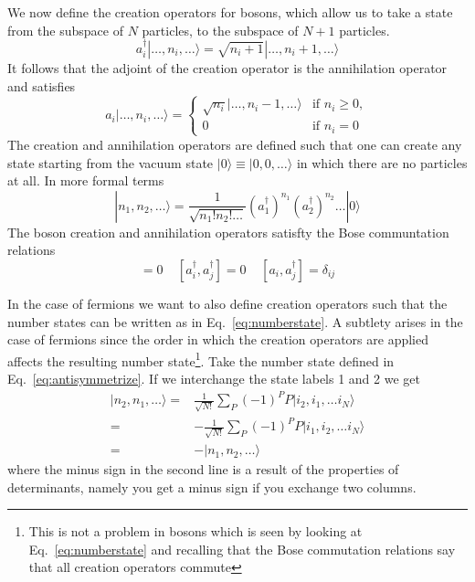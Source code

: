 \documentclass[11pt,letter]{article}
\begin{document}
We now define the creation  operators for bosons, which allow us to take a
state from the subspace of $N$ particles, to the subspace of $N+1$  particles.
\begin{equation}
 a_{i}^{\dagger} | \ldots, n_{i}, \ldots \rangle  = 
 \sqrt{n_{i}+1}|\ldots, n_{i}+1, \dots\rangle
\end{equation}
It follows that the adjoint of the creation operator is the annihilation
operator and satisfies 
\begin{equation}
a_{i} | \ldots, n_{i}, \ldots \rangle  
=\begin{cases}
\sqrt{n_{i}}|\ldots, n_{i}-1, \dots\rangle
& \text{if $n_{i}\geq 0$},\\
0 & \text{if $n_{i}=0$}
\end{cases}
\end{equation}
The creation and annihilation operators are defined such that one can create
any state starting from the vacuum state $|0\rangle \equiv |0,0,\ldots\rangle$
in which there are no particles at all.  In more formal terms 
\begin{equation}
  | n_{1}, n_{2}, \dots \rangle = \frac{1}{\sqrt{n_{1}!n_{2}!\ldots}} 
   ( a_{1}^{\dagger} ) ^{n_{1}}  
   ( a_{2}^{\dagger} ) ^{n_{2}}  \ldots | 0 \rangle
  \label{eq:numberstate}
\end{equation}
The boson creation and annihilation operators satisfty the Bose communtation
relations 
\begin{equation}
  [a_{i}, a_{j}] = 0 \ \ \ \ \  
  [a_{i}^{\dagger}, a_{j}^{\dagger}] = 0 \ \ \ \ \   
  [a_{i},a_{j}^{\dagger}]=\delta_{ij}
\end{equation}

In the case of fermions we want to also define creation  operators such that
the number states can be written as in Eq.~\ref{eq:numberstate}.    A subtlety
arises in the case of fermions since  the order in which the creation operators
are applied affects the resulting number state\footnote{This is not a problem
in bosons which is seen by looking at Eq.~\ref{eq:numberstate} and recalling
that the Bose commutation relations say that all creation operators commute}.
Take the number state defined in Eq.~\ref{eq:antisymmetrize}.  If we
interchange the state labels 1 and 2 we get 
\begin{equation}
\begin{split}
  | n_{2},  n_{1}, \ldots \rangle = &
  \frac{1}{\sqrt{N!}} \sum_{P} (- 1)^{P} P | i_{2},  i_{1}, \ldots i_{N} \rangle \\
   = & -
  \frac{1}{\sqrt{N!}} \sum_{P} (- 1)^{P} P | i_{1},  i_{2}, \ldots i_{N} \rangle \\ 
   = & -
  | n_{1},  n_{2}, \ldots \rangle 
\end{split}
\label{eq:fermionsign}
\end{equation} 
where the minus sign in the second line is a result of the properties of
determinants, namely you get a minus sign if you exchange two columns. 
\end{document}
